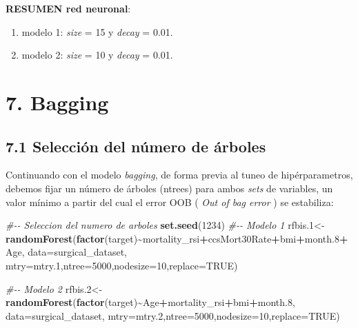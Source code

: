 \documentclass[
]{article}
\newenvironment{Shaded}{\begin{snugshade}}{\end{snugshade}}
\newcommand{\CommentTok}[1]{\textcolor[rgb]{0.56,0.35,0.01}{\textit{#1}}}
\newcommand{\DataTypeTok}[1]{\textcolor[rgb]{0.13,0.29,0.53}{#1}}
\newcommand{\DecValTok}[1]{\textcolor[rgb]{0.00,0.00,0.81}{#1}}
\newcommand{\FloatTok}[1]{\textcolor[rgb]{0.00,0.00,0.81}{#1}}
\newcommand{\KeywordTok}[1]{\textcolor[rgb]{0.13,0.29,0.53}{\textbf{#1}}}
\newcommand{\NormalTok}[1]{#1}
\newcommand{\OperatorTok}[1]{\textcolor[rgb]{0.81,0.36,0.00}{\textbf{#1}}}
\newcommand{\OtherTok}[1]{\textcolor[rgb]{0.56,0.35,0.01}{#1}}
\providecommand{\tightlist}{%
  \setlength{\itemsep}{0pt}\setlength{\parskip}{0pt}}
\begin{document}
\textbf{RESUMEN red neuronal}:

\begin{enumerate}
\def\labelenumi{\arabic{enumi}.}
\tightlist
\item
  modelo 1: \emph{size} = 15 y \emph{decay} = 0.01.
\item
  modelo 2: \emph{size} = 10 y \emph{decay} = 0.01.
\end{enumerate}

\hypertarget{bagging}{%
\section{7. Bagging}\label{bagging}}

\hypertarget{selecciuxf3n-del-nuxfamero-de-uxe1rboles}{%
\subsection{7.1 Selección del número de
árboles}\label{selecciuxf3n-del-nuxfamero-de-uxe1rboles}}

Continuando con el modelo \emph{bagging}, de forma previa al tuneo de
hipérparametros, debemos fijar un número de árboles (ntrees) para ambos
\emph{sets} de variables, un valor mínimo a partir del cual el error OOB
( \emph{Out of bag error} ) se estabiliza:

\begin{Shaded}
\begin{Highlighting}[]
\CommentTok{\#{-}{-} Seleccion del numero de arboles}
\KeywordTok{set.seed}\NormalTok{(}\DecValTok{1234}\NormalTok{)}
\CommentTok{\#{-}{-} Modelo 1}
\NormalTok{rfbis}\FloatTok{.1}\NormalTok{<{-}}\KeywordTok{randomForest}\NormalTok{(}\KeywordTok{factor}\NormalTok{(target)}\OperatorTok{\textasciitilde{}}\NormalTok{mortality\_rsi}\OperatorTok{+}\NormalTok{ccsMort30Rate}\OperatorTok{+}\NormalTok{bmi}\OperatorTok{+}\NormalTok{month}\FloatTok{.8}\OperatorTok{+}\NormalTok{Age,}
                      \DataTypeTok{data=}\NormalTok{surgical\_dataset,}
                      \DataTypeTok{mtry=}\NormalTok{mtry}\FloatTok{.1}\NormalTok{,}\DataTypeTok{ntree=}\DecValTok{5000}\NormalTok{,}\DataTypeTok{nodesize=}\DecValTok{10}\NormalTok{,}\DataTypeTok{replace=}\OtherTok{TRUE}\NormalTok{)}

\CommentTok{\#{-}{-} Modelo 2}
\NormalTok{rfbis}\FloatTok{.2}\NormalTok{<{-}}\KeywordTok{randomForest}\NormalTok{(}\KeywordTok{factor}\NormalTok{(target)}\OperatorTok{\textasciitilde{}}\NormalTok{Age}\OperatorTok{+}\NormalTok{mortality\_rsi}\OperatorTok{+}\NormalTok{bmi}\OperatorTok{+}\NormalTok{month}\FloatTok{.8}\NormalTok{,}
                      \DataTypeTok{data=}\NormalTok{surgical\_dataset,}
                      \DataTypeTok{mtry=}\NormalTok{mtry}\FloatTok{.2}\NormalTok{,}\DataTypeTok{ntree=}\DecValTok{5000}\NormalTok{,}\DataTypeTok{nodesize=}\DecValTok{10}\NormalTok{,}\DataTypeTok{replace=}\OtherTok{TRUE}\NormalTok{)}
\end{Highlighting}
\end{Shaded}
\end{document}
